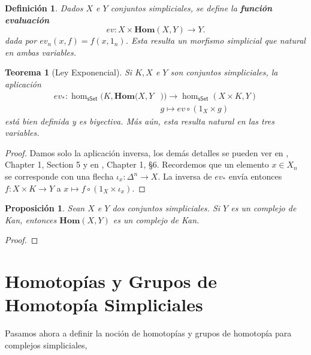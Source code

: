 \documentclass[11pt]{report}
\theoremstyle{colored}
\newtheorem{definition}{Definición}[section]
\newtheorem{theorem}{Teorema}[section]
\newtheorem{proposition}{Proposición}[section]
\newcommand{\cat}[1]{\mathsf{#1}}
\renewcommand{\ss}[1]{\Delta^{#1}}
\newcommand{\homcomplex}{\mathbf{Hom}}
\begin{document}
\begin{definition} Dados $X$ e $Y$ conjuntos simpliciales, se define la \textbf{función evaluación}
\[
ev : X \times \homcomplex(X,Y) \to Y.
\]
dada por $ev_n(x,f) = f(x,1_n)$. Esta resulta un morfismo simplicial que natural en ambas variables.
\end{definition}

\begin{theorem}[Ley Exponencial] Si $K,X$ e $Y$ son conjuntos simpliciales, la aplicación
\begin{align*}
ev_* : \hom_{\cat{sSet}}(K,\homcomplex(X,Y&)) \to \hom_{\cat{sSet}}(X \times K,Y)\\
&g \longmapsto ev \circ (1_X \times g)
\end{align*}
está bien definida y es biyectiva. Más aún, esta resulta natural en las tres variables.
\end{theorem}
\begin{proof} Damos solo la aplicación inversa, los demás detalles se pueden ver en \cite{GJ}, Chapter 1, Section 5 y en \cite{M}, Chapter 1, \S 6. Recordemos que un elemento $x \in X_n$ se corresponde con una flecha $\iota_x : \ss{n} \to X$. La inversa de $ev_*$ envía entonces $f : X \times K \to Y$ a $x \mapsto f \circ (1_X \times \iota_x)$.
\end{proof}

\begin{proposition} \label{homcomplex-kan} Sean $X$ e $Y$ dos conjuntos simpliciales. Si $Y$ es un complejo de Kan, entonces $\homcomplex(X,Y)$ es un complejo de Kan.
\end{proposition}
\begin{proof}
\end{proof}

\section{Homotopías y Grupos de Homotopía Simpliciales}

Pasamos ahora a definir la noción de homotopías y grupos de homotopía para complejos simpliciales,
\end{document}
